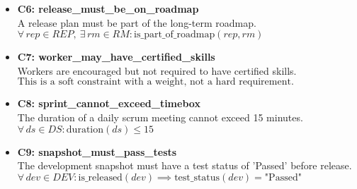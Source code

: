 \documentclass[11pt]{article}
\begin{document}
\begin{itemize}
    \item \textbf{C6: release\_must\_be\_on\_roadmap} \\
          A release plan must be part of the long-term roadmap. \\
          $\forall\, rep \in REP,\ \exists\, rm \in RM : \text{is\_part\_of\_roadmap}(rep, rm)$

    \item \textbf{C7: worker\_may\_have\_certified\_skills} \\
          Workers are encouraged but not required to have certified skills. \\
          $\text{This is a soft constraint with a weight, not a hard requirement.}$

    \item \textbf{C8: sprint\_cannot\_exceed\_timebox} \\
          The duration of a daily scrum meeting cannot exceed 15 minutes. \\
          $\forall\, ds \in DS : \text{duration}(ds) \leq 15$

    \item \textbf{C9: snapshot\_must\_pass\_tests} \\
          The development snapshot must have a test status of 'Passed' before release. \\
          $\forall\, dev \in DEV : \text{is\_released}(dev) \implies \text{test\_status}(dev) = \text{"Passed"}$
\end{itemize}
\end{document}
